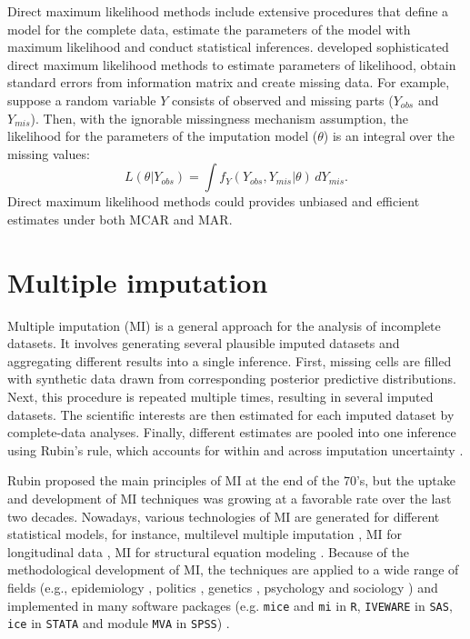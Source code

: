 Direct maximum likelihood methods include extensive procedures that define a model for the complete data, estimate the parameters of the model with maximum likelihood and conduct statistical inferences. \citet{little2019statistical} developed sophisticated direct maximum likelihood methods to estimate parameters of likelihood, obtain standard errors from information matrix and create missing data. For example, suppose a random variable $Y$ consists of observed and missing parts ($Y_{obs}$ and $Y_{mis}$). Then, with the ignorable missingness mechanism assumption, the likelihood for the parameters of the imputation model ($\theta$) is an integral over the missing values:
\begin{equation*}
	L(\theta | Y_{obs}) =  \int f_{Y}(Y_{obs}, Y_{mis} | \theta)  \,dY_{mis}. 
\end{equation*}
Direct maximum likelihood methods could provides unbiased and efficient estimates under both MCAR and MAR. 

\section{Multiple imputation}
Multiple imputation (MI) is a general approach for the analysis of incomplete datasets. It involves generating several plausible imputed datasets and aggregating different results into a single inference. First, missing cells are filled with synthetic data drawn from corresponding posterior predictive distributions. Next, this procedure is repeated multiple times, resulting in several imputed datasets. The scientific interests are then estimated for each imputed dataset by complete-data analyses. Finally, different estimates are pooled into one inference using Rubin’s rule, which accounts for within and across imputation uncertainty \citep{RubinD1987}.

Rubin proposed the main principles of MI at the end of the 70's, but the uptake and development of MI techniques was growing at a favorable rate over the last two decades. Nowadays, various technologies of MI are generated for different statistical models, for instance, multilevel multiple imputation \citep{longford2001multilevel}, MI for longitudinal data \citep{twisk2002attrition, demirtas2004modeling}, MI for structural equation modeling \citep{olinsky2003comparative, allison2003missing}. Because of the methodological development of MI, the techniques are applied to a wide range of fields (e.g., epidemiology \citep{mueller2008injuries}, politics \citep{tanasoiu2008determinants}, genetics \citep{souverein2006multiple}, psychology \citep{sundell2008transportability} and sociology \citep{finke2008cross}) and implemented in many software packages (e.g. \texttt{mice} and \texttt{mi} in \texttt{R}, \texttt{IVEWARE} in \texttt{SAS}, \texttt{ice} in \texttt{STATA} and module \texttt{MVA} in \texttt{SPSS}) \citep{Buuren2011, azur2011multiple}.  

